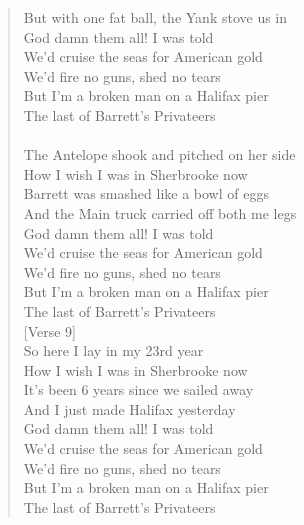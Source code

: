 \documentclass[11pt]{article}
\begin{document}
\begin{verse}
But with one fat ball, the Yank stove us in\\
God damn them all! I was told\\
We'd cruise the seas for American gold\\
We'd fire no guns, shed no tears\\
But I'm a broken man on a Halifax pier\\
The last of Barrett's Privateers\\
[Verse 8]\\
The Antelope shook and pitched on her side\\
How I wish I was in Sherbrooke now\\
Barrett was smashed like a bowl of eggs\\
And the Main truck carried off both me legs\\
God damn them all! I was told\\
We'd cruise the seas for American gold\\
We'd fire no guns, shed no tears\\
But I'm a broken man on a Halifax pier\\
The last of Barrett's Privateers\\
\vspace*{1em}
[Verse 9]\\
So here I lay in my 23rd year\\
How I wish I was in Sherbrooke now\\
It's been 6 years since we sailed away\\
And I just made Halifax yesterday\\
God damn them all! I was told\\
We'd cruise the seas for American gold\\
We'd fire no guns, shed no tears\\
But I'm a broken man on a Halifax pier\\
The last of Barrett's Privateers\\
\end{verse}
\clearpage
\end{document}
